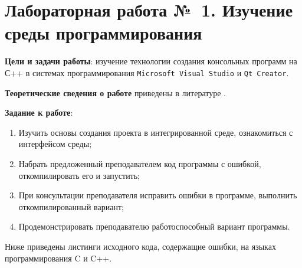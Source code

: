 \documentclass[main.tex]{subfiles}
\begin{document}
\chapter[Л/р~1 Изучение среды программирования]{Лабораторная работа №~1. Изучение среды программирования}

\textbf{Цели и задачи работы}: изучение технологии создания консольных программ на С++ в системах программирования \texttt{Microsoft Visual Studio} и \texttt{Qt Creator}.

\textbf{Теоретические сведения о работе} приведены в литературе \cite{vs2010,qt2019}.

\textbf{Задание к работе}:
\begin{enumerate}
    \item Изучить основы создания проекта в интегрированной среде, ознакомиться с интерфейсом среды;
    \item Набрать предложенный преподавателем код программы с ошибкой, откомпилировать его и запустить;
    \item При консультации преподавателя исправить ошибки в программе, выполнить откомпилированный вариант;
    \item Продемонстрировать преподавателю работоспособный вариант программы.
\end{enumerate}

Ниже приведены листинги исходного кода, содержащие ошибки, на языках программирования C и C++.



\newpage
{}

\end{document}

